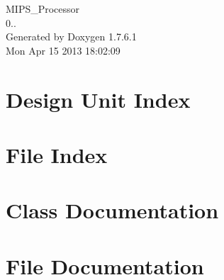 \documentclass[a4paper]{book}
\begin{document}
\hypersetup{pageanchor=false,citecolor=blue}
\begin{titlepage}
\vspace*{7cm}
\begin{center}
{\Large \-M\-I\-P\-S\-\_\-\-Processor \\[1ex]\large 0.. }\\
\vspace*{1cm}
{\large \-Generated by Doxygen 1.7.6.1}\\
\vspace*{0.5cm}
{\small Mon Apr 15 2013 18:02:09}\\
\end{center}
\end{titlepage}
\clearemptydoublepage
{}
\tableofcontents
\clearemptydoublepage
{}
\hypersetup{pageanchor=true,citecolor=blue}
\chapter{\-Design \-Unit \-Index}

\chapter{\-File \-Index}

\chapter{\-Class \-Documentation}














































\chapter{\-File \-Documentation}


\printindex
\end{document}
